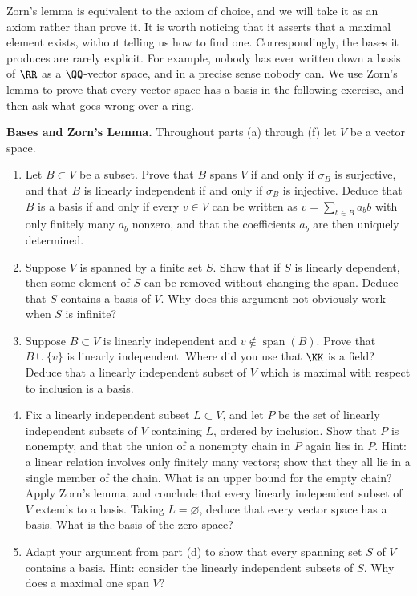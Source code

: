 \documentclass[12pt,reqno]{amsart}
\begin{document}
Zorn's lemma is equivalent to the axiom of choice, and we will take it as an axiom rather than prove it. It is worth noticing that it asserts that a maximal element exists, without telling us how to find one. Correspondingly, the bases it produces are rarely explicit. For example, nobody has ever written down a basis of $\RR$ as a $\QQ$-vector space, and in a precise sense nobody can. We use Zorn's lemma to prove that every vector space has a basis in the following exercise, and then ask what goes wrong over a ring.

\hrulefill

\begin{problems}
\item\label{c:bases} \textbf{Bases and Zorn's Lemma.} Throughout parts (a) through (f) let $V$ be a vector space.
\begin{enumerate}
\item Let $B\subset V$ be a subset. Prove that $B$ spans $V$ if and only if $\sigma_B$ is surjective, and that $B$ is linearly independent if and only if $\sigma_B$ is injective. Deduce that $B$ is a basis if and only if every $v\in V$ can be written as $v=\sum_{b\in B}a_bb$ with only finitely many $a_b$ nonzero, and that the coefficients $a_b$ are then uniquely determined.
\item Suppose $V$ is spanned by a finite set $S$. Show that if $S$ is linearly dependent, then some element of $S$ can be removed without changing the span. Deduce that $S$ contains a basis of $V$. Why does this argument not obviously work when $S$ is infinite?
\item Suppose $B\subset V$ is linearly independent and $v\notin\operatorname{span}(B)$. Prove that $B\cup\{v\}$ is linearly independent. Where did you use that $\KK$ is a field? Deduce that a linearly independent subset of $V$ which is maximal with respect to inclusion is a basis.
\item Fix a linearly independent subset $L\subset V$, and let $P$ be the set of linearly independent subsets of $V$ containing $L$, ordered by inclusion. Show that $P$ is nonempty, and that the union of a nonempty chain in $P$ again lies in $P$. Hint: a linear relation involves only finitely many vectors; show that they all lie in a single member of the chain. What is an upper bound for the empty chain? Apply Zorn's lemma, and conclude that every linearly independent subset of $V$ extends to a basis. Taking $L=\varnothing$, deduce that every vector space has a basis. What is the basis of the zero space?
\item Adapt your argument from part (d) to show that every spanning set $S$ of $V$ contains a basis. Hint: consider the linearly independent subsets of $S$. Why does a maximal one span $V$?

\end{enumerate}
\end{problems}
\end{document}
